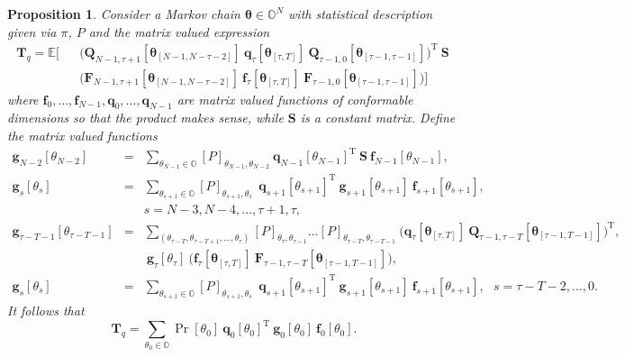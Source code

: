 \documentclass[letterpaper,11pt]{article}
\newcommand{\T}{\mathrm{T}}
\newtheorem{proposition}[theorem]{Proposition}
\begin{document}
\begin{proposition} \label{lemma2}
	Consider a Markov chain $ \bm{\theta} \in \mathbb{O}^N$ with statistical description given via $ \pi$, $P$ 
	and the matrix valued expression 
	\begin{eqnarray}
	\label{typical_quadratic_term}
	\nonumber
	\mathbf{T}_q  =  \mathbb{E}\bigg[&&
	\bigg( \mathbf{Q}_{N-1, \tau+1}[\bm{\theta}_{[N-1,N-\tau-2]}] ~ 
	\mathbf{q}_{\tau}[\bm{\theta}_{[\tau,T]}] ~ 
	\mathbf{Q}_{\tau-1, 0}[\bm{\theta}_{[\tau-1,\tau-1]}]
	\bigg)^\T ~ \mathbf{S} ~ \\
	&&  \bigg( \mathbf{F}_{N-1, \tau+1}[\bm{\theta}_{[N-1,N-\tau-2]}] ~ 
	\mathbf{f}_{\tau}[\bm{\theta}_{[\tau,T]}] ~ 
	\mathbf{F}_{\tau-1, 0}[\bm{\theta}_{[\tau-1,\tau-1]}]
	\bigg) \bigg] 
	\end{eqnarray}
	where  $\mathbf{f}_0, \hdots, \mathbf{f}_{N-1}, \mathbf{q}_0, \hdots, \mathbf{q}_{N-1}$ 
	are matrix valued functions of conformable dimensions so that the product makes sense, while $ \mathbf{S}$ is a constant matrix.  
	Define the matrix valued functions 
	\begin{eqnarray}
	\label{recursive_quadratic}
	\mathbf{g}_{N-2}[\theta_{N-2}] & = & \sum_{\theta_{N-1} \in \mathbb{O}} 
	[P]_{\theta_{N-1}, \theta_{N-2}} ~ \mathbf{q}_{N-1}[\theta_{N-1}]^\T~
	\mathbf{S} ~  \mathbf{f}_{N-1}[\theta_{N-1}],  \\
	\nonumber
	\mathbf{g}_{s}[\theta_{s}] & = & \sum_{\theta_{s+1} \in \mathbb{O}} 
	[P]_{\theta_{s+1}, \theta_{s}} ~  
	~ \mathbf{q}_{s+1}[\theta_{s+1}]^\T~
	\mathbf{g}_{s+1}[\theta_{s+1}]~ \mathbf{f}_{s+1}[\theta_{s+1}], \\ ~
	&& s = N-3, N-4, \hdots, \tau+1, \tau,  \\
	\nonumber
	\mathbf{g}_{\tau-T-1}[\theta_{\tau-T-1}] & = &
	\sum_{(\theta_{\tau-T},\theta_{\tau-T+1}, \hdots, \theta_{\tau} )} 
	[P]_{\theta_{\tau}, \theta_{\tau-1}} \hdots [P]_{\theta_{\tau-T}, \theta_{\tau-T-1}} ~ \bigg( \mathbf{q}_{\tau}[\bm{\theta}_{[\tau,T]}] ~ \mathbf{Q}_{\tau-1, \tau-T}[ \bm{\theta}_{[\tau-1,T-1]}] \bigg)^\T,\\
	&& 
	~ \mathbf{g}_{\tau}[\theta_{\tau}] ~
	\bigg( \mathbf{f}_{\tau}[\bm{\theta}_{[\tau,T]}] ~ 
	\mathbf{F}_{\tau-1, \tau-T}[ \bm{\theta}_{[\tau-1,T-1]}] \bigg), \\
	\mathbf{g}_{s}[\theta_{s}] & = & \sum_{\theta_{s+1} \in \mathbb{O}} 
	[P]_{\theta_{s+1}, \theta_{s}} ~  
	~ \mathbf{q}_{s+1}[\theta_{s+1}]^\T~
	\mathbf{g}_{s+1}[\theta_{s+1}]~ \mathbf{f}_{s+1}[\theta_{s+1}], ~~~
	s = \tau - T -2 ,   \hdots, 0.  
	\end{eqnarray}
	It follows that 
	$$
	\mathbf{T}_q = \sum_{\theta_0 \in \mathbb{O}}	\Pr[ \theta_0 ] ~ \mathbf{q}_0[\theta_0]^\T ~ \mathbf{g}_0[\theta_0] ~\mathbf{f}_0[\theta_0].
	$$
\end{proposition}
\end{document}

